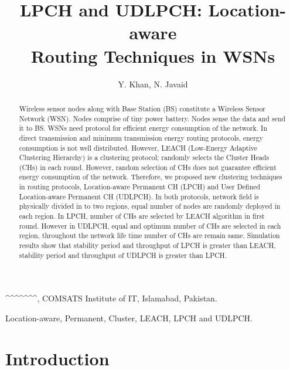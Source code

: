 \documentclass[journal]{IEEEtran}
\begin{document}
\title{LPCH and UDLPCH: Location-aware \\Routing Techniques in WSNs}

\author{Y. Khan, N. Javaid}^{\sharp}^{\ddag}^{\ddag}^{\ddag}^{\ddag}^{\sharp}^{\CAST, COMSATS Institute of IT, Islamabad, Pakistan.
     }

\maketitle

\begin{abstract}
Wireless sensor nodes along with Base Station (BS) constitute a Wireless Sensor Network (WSN). Nodes comprise of tiny power battery. Nodes sense the data and send it to BS. WSNs need protocol for efficient energy consumption of the network. In direct transmission and minimum transmission energy routing protocols, energy consumption is not well distributed. However, LEACH (Low-Energy Adaptive Clustering Hierarchy) is a clustering protocol; randomly selects the Cluster Heads (CHs) in each round. However, random selection of CHs does not guarantee efficient energy consumption of the network. Therefore, we proposed new clustering techniques in routing protocols, Location-aware Permanent CH (LPCH) and User Defined Location-aware Permanent CH (UDLPCH). In both protocols, network field is physically divided in to two regions, equal number of nodes are randomly deployed in each region. In LPCH, number of CHs are selected by LEACH algorithm in first round. However in UDLPCH, equal and optimum number of CHs are selected in each region, throughout the network life time number of CHs are remain same. Simulation results show that stability period and throughput of LPCH is greater than LEACH, stability period and throughput of UDLPCH is greater than LPCH.
\end{abstract}

\begin{IEEEkeywords}
Location-aware, Permanent, Cluster, LEACH, LPCH and UDLPCH.
\end{IEEEkeywords}

\IEEEpeerreviewmaketitle

\section{Introduction}
\end{document}
